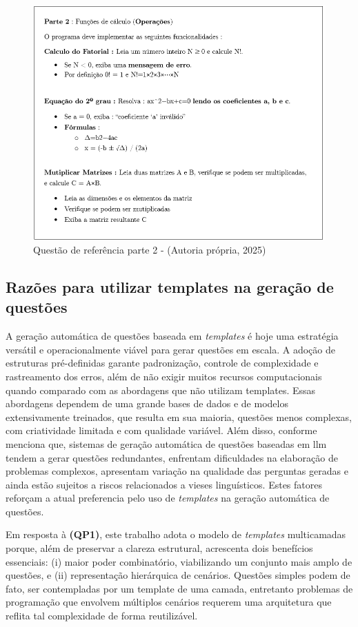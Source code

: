 \begin{figure}[ht]
    \centering
    \includegraphics[width=12cm]{./imagens/capitulo4/questao-referencia-2.png}
    \caption{Questão de referência parte 2 - (Autoria própria, 2025)}
    \label{fig:questao-referencia-part-2}
\end{figure}


\subsection{Razões para utilizar templates na geração de questões}

A geração automática de questões baseada em \textit{templates} é hoje uma estratégia versátil e operacionalmente viável para gerar questões em escala. A adoção de estruturas pré-definidas garante padronização, controle de complexidade e rastreamento dos erros, além de não exigir muitos recursos computacionais quando comparado com as abordagens que não utilizam templates. Essas abordagens dependem de uma grande bases de dados e de modelos extensivamente treinados, que resulta em sua maioria, questões menos complexas, com criatividade limitada e com qualidade variável. Além disso, conforme \parencite{maity2024} menciona que, sistemas de geração automática de questões  baseadas em \gls{llm} tendem a gerar questões redundantes, enfrentam dificuldades na elaboração de problemas complexos, apresentam variação na qualidade das perguntas geradas e ainda estão sujeitos a riscos relacionados a vieses linguísticos. Estes fatores reforçam a atual preferencia pelo uso de \textit{templates} na geração automática de questões.

Em resposta à \textbf{(QP1)}, este trabalho adota o modelo de \textit{templates} multicamadas porque, além de preservar a clareza estrutural, acrescenta dois benefícios essenciais: (i) maior poder combinatório, viabilizando um conjunto mais amplo de questões, e (ii) representação hierárquica de cenários. Questões simples podem de fato, ser contempladas por um template de uma camada, entretanto problemas de programação que envolvem múltiplos cenários requerem uma arquitetura que reflita tal complexidade de forma reutilizável.

